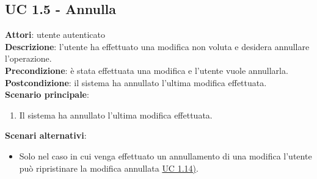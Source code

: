 \subsection{UC 1.5 - Annulla}{
	\label{uc1.5}
	\textbf{Attori}: utente autenticato \\
	\textbf{Descrizione}: l'utente ha effettuato una modifica non voluta e desidera annullare l'operazione. \\
	\textbf{Precondizione}: è stata effettuata una modifica e l'utente vuole annullarla.	\\
	\textbf{Postcondizione}: il sistema ha annullato l'ultima modifica effettuata.	\\
	\textbf{Scenario principale}:
	\begin{enumerate}
		\item Il sistema ha annullato l'ultima modifica effettuata.
	\end{enumerate}				
	\textbf{Scenari alternativi}: 
	\begin{itemize}
		\item Solo nel caso in cui venga effettuato un annullamento di una modifica l'utente può ripristinare la modifica annullata \hyperref[uc1.14]{UC 1.14)}.
	\end{itemize}
	}
